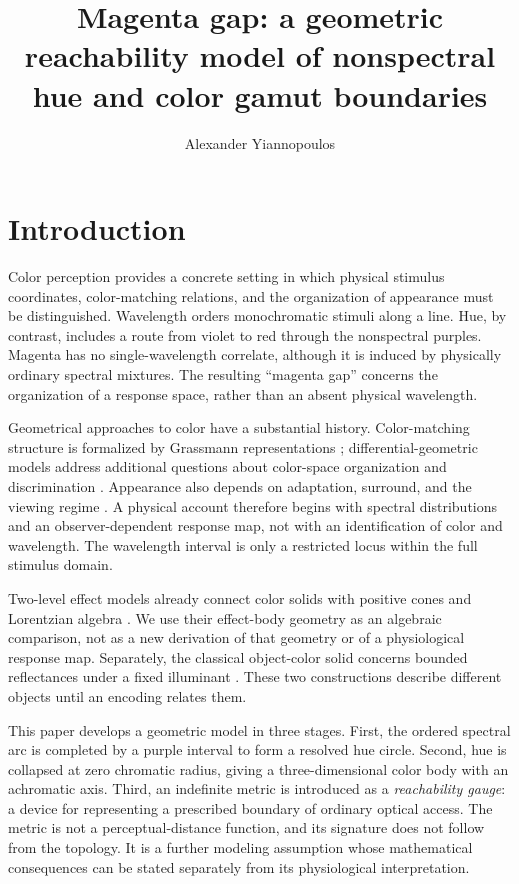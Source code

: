 \documentclass[9pt,twocolumn,twoside]{opticajnl}
\title{Magenta gap: a geometric reachability model of nonspectral hue and color gamut boundaries}
\author[1,*]{Alexander Yiannopoulos}
\affil[1]{A$\lvert\Omega\rangle$ Institute, Alpha Omega Lattice Corporation, 3724 Laurel Street, Suite 108, New Orleans, Louisiana, USA}
\affil[*]{ayianno@ao.institute}
\theoremstyle{plain}
\begin{document}
\maketitle

\section{Introduction}
\label{sec:introduction}
Color perception provides a concrete setting in which physical stimulus coordinates, color-matching relations, and the organization of appearance must be distinguished. Wavelength orders monochromatic stimuli along a line. Hue, by contrast, includes a route from violet to red through the nonspectral purples. Magenta has no single-wavelength correlate, although it is induced by physically ordinary spectral mixtures. The resulting ``magenta gap'' concerns the organization of a response space, rather than an absent physical wavelength.

Geometrical approaches to color have a substantial history. Color-matching structure is formalized by Grassmann representations \cite{Krantz1975}; differential-geometric models address additional questions about color-space organization and discrimination \cite{Resnikoff1974}. Appearance also depends on adaptation, surround, and the viewing regime \cite{Shevell2003,Fairchild2013}. A physical account therefore begins with spectral distributions and an observer-dependent response map, not with an identification of color and wavelength. The wavelength interval is only a restricted locus within the full stimulus domain.

Two-level effect models already connect color solids with positive cones and Lorentzian algebra \cite{Berthier2020,BerthierProvenzi2022}. We use their effect-body geometry as an algebraic comparison, not as a new derivation of that geometry or of a physiological response map. Separately, the classical object-color solid concerns bounded reflectances under a fixed illuminant \cite{Koenderink2010,Logvinenko2025}. These two constructions describe different objects until an encoding relates them.

This paper develops a geometric model in three stages. First, the ordered spectral arc is completed by a purple interval to form a resolved hue circle. Second, hue is collapsed at zero chromatic radius, giving a three-dimensional color body with an achromatic axis. Third, an indefinite metric is introduced as a \emph{reachability gauge}: a device for representing a prescribed boundary of ordinary optical access. The metric is not a perceptual-distance function, and its signature does not follow from the topology. It is a further modeling assumption whose mathematical consequences can be stated separately from its physiological interpretation.
\end{document}
